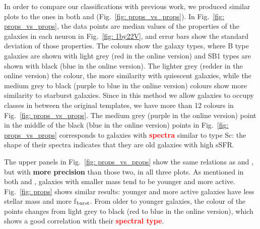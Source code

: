         In order to compare our classifications with previous work, we produced similar plots to the ones in both  and  (Fig.~\ref{fig: props_vs_props}).
        In Fig.~\ref{fig: props_vs_props}, the data points are median values of the properties of the galaxies in each neuron in Fig.~\ref{fig: 1by22V}, and error bars show the standard deviation of those properties.
        The colours show the galaxy types, where B type galaxies are shown with light grey (red in the online version) and SB1 types are shown with black (blue in the online version).
        The lighter grey (redder in the online version) the colour, the more similarity with quiescent galaxies, while the medium grey to black (purple to blue in the online version) colours show more similarity to starburst galaxies.
        Since in this method we allow galaxies to occupy classes in between the original  templates, we have more than 12 colours in Fig.~\ref{fig: props_vs_props}.
        The medium grey (purple in the online version) point in the middle of the black (blue in the online version) points in Fig.~\ref{fig: props_vs_props} corresponds to galaxies with \textbf{\textcolor{red}{spectra}} similar to type Sc: the shape of their spectra indicates that they are old galaxies with high sSFR.
        
        The upper panels in Fig.~\ref{fig: props_vs_props} show the same relations as  and , but with \textbf{more precision} than those two, in all three plots.
        As mentioned in both  and , galaxies with smaller mass tend to be younger and more active.
        Fig.~\ref{fig: props} shows similar results: younger and more active galaxies have less stellar mass and more f$_{\rm {burst}}$.
        From older to younger galaxies, the colour of the points changes from light grey to black (red to blue in the online version), which shows a good correlation with their \textbf{\textcolor{red}{spectral type}}.
        
